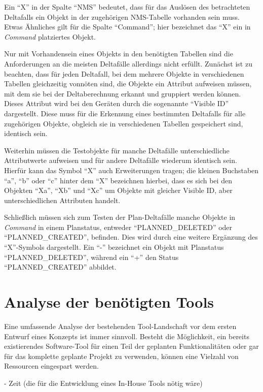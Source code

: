 Ein \enquote{X} in der Spalte \enquote{NMS} bedeutet, dass für das Auslösen des betrachteten Deltafalls ein Objekt in der zugehörigen \ac{NMS}-Tabelle vorhanden sein muss. Etwas Ähnliches gilt für die Spalte \enquote{Command}; hier bezeichnet das \enquote{X} ein in \textit{Command} platziertes Objekt.

Nur mit Vorhandensein eines Objekts in den benötigten Tabellen sind die Anforderungen an die meisten Deltafälle allerdings nicht erfüllt. Zunächst ist zu beachten, dass für jeden Deltafall, bei dem mehrere Objekte in verschiedenen Tabellen gleichzeitig vonnöten sind, die Objekte ein Attribut aufweisen müssen, mit dem sie bei der Deltaberechnung erkannt und gruppiert werden können. Dieses Attribut wird bei den Geräten durch die sogenannte \enquote{Visible ID} dargestellt. Diese muss für die Erkennung eines bestimmten Deltafalls für alle zugehörigen Objekte, obgleich sie in verschiedenen Tabellen gespeichert sind, identisch sein.

Weiterhin müssen die Testobjekte für manche Deltafälle unterschiedliche Attributwerte aufweisen und für andere Deltafälle wiederum identisch sein. Hierfür kann das Symbol \enquote{X} auch Erweiterungen tragen; die kleinen Buchstaben \enquote{a}, \enquote{b} oder \enquote{c} hinter dem \enquote{X} bezeichnen hierbei, dass es sich bei den Objekten \enquote{Xa}, \enquote{Xb} und \enquote{Xc} um Objekte mit gleicher Visible ID, aber unterschiedlichen Attributen handelt.

Schließlich müssen sich zum Testen der Plan-Deltafälle manche Objekte in \textit{Command} in einem Planstatus, entweder \enquote{PLANNED\_DELETED} oder \enquote{PLANNED\_CREATED}, befinden. Dies wird durch eine weitere Ergänzung des \enquote{X}-Symbols dargestellt. Ein \enquote{-} bezeichnet ein Objekt mit Planstatus \enquote{PLANNED\_DELETED}, während ein \enquote{+} den Status \enquote{PLANNED\_CREATED} abbildet.

\section{Analyse der benötigten Tools}\label{sec:toolanalyse}
Eine umfassende Analyse der bestehenden Tool-Landschaft vor dem ersten Entwurf eines Konzepts ist immer sinnvoll. Besteht die Möglichkeit, ein bereits existierendes Software-Tool für einen Teil der geplanten Funktionalitäten oder gar für das komplette geplante Projekt zu verwenden, können eine Vielzahl von Ressourcen eingespart werden. 

- Zeit (die für die Entwicklung eines In-House Tools nötig wäre)

